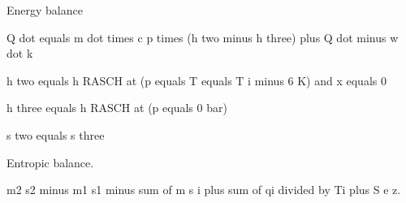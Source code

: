 Energy balance

Q dot equals m dot times c p times (h two minus h three) plus Q dot minus w dot k

h two equals h RASCH at (p equals T equals T i minus 6 K) and x equals 0

h three equals h RASCH at (p equals 0 bar)

s two equals s three

Entropic balance.

m2 s2 minus m1 s1 minus sum of m s i plus sum of qi divided by Ti plus S e z.